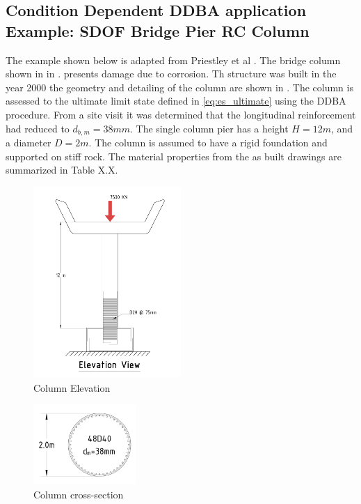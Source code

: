 \subsection{Condition Dependent DDBA application Example: SDOF Bridge Pier RC Column}

The example shown below is adapted from Priestley et al \cites{Priestley2007}. The bridge column shown in in . presents damage due to corrosion. Th structure was built in the year 2000 the geometry and detailing of the column are shown in . The column is assessed to the ultimate limit state defined in \eqref{eq:es_ultimate} using the DDBA procedure. From a site visit it was determined that the longitudinal reinforcement had reduced to $d_{b,m}=38mm$. The single column pier has a height $H=12m$, and a diameter $D=2m$. The column is assumed to have a rigid foundation and supported on stiff rock. The material properties from the as built drawings are summarized in Table X.X.

\begin{figure}[htbp]
	\centering
	\includegraphics[width=0.5\textwidth]{VAC Thesis 2.0/Chapter-6/figs/Column_Elevation.pdf}
	\caption{Column Elevation}
	\label{fig:column_elevation_assessment}
\end{figure}

\begin{figure}[htbp]
	\centering
	\includegraphics[width=0.35\textwidth]{VAC Thesis 2.0/Chapter-6/figs/ColumnSection_Assessment.pdf}
	\caption{Column cross-section}
	\label{fig:cross_section_assessment}
\end{figure}


